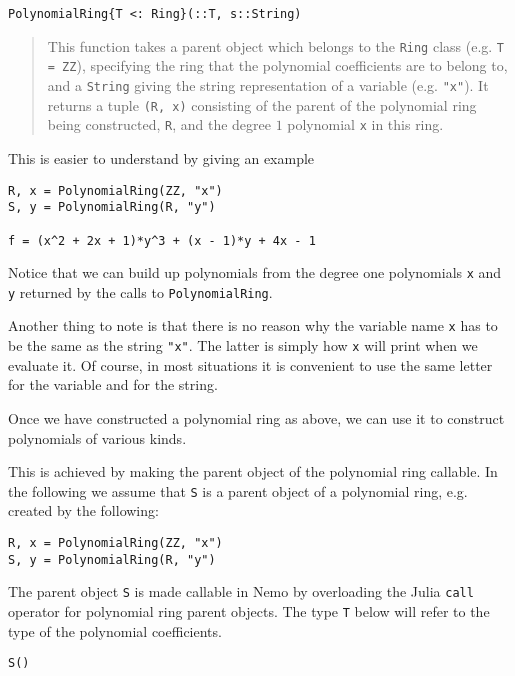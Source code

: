 \documentclass[a4paper,10pt]{article}
\newcommand{\code}{\lstinline}
\newcommand{\desc}[1]{\vspace{-3mm}\begin{quote}#1\end{quote}}
\begin{document}
\begin{lstlisting}
PolynomialRing{T <: Ring}(::T, s::String)
\end{lstlisting}

\desc{This function takes a parent object which belongs to the \code|Ring| class 
(e.g. \code|T = ZZ|), specifying the ring that the polynomial coefficients are to 
belong to, and a \code{String} giving the string representation of a variable (e.g. 
\code|"x"|). It returns a tuple \code|(R, x)| consisting of the parent of the polynomial
ring being constructed, \code|R|, and the degree $1$ polynomial \code|x| in this ring.}

This is easier to understand by giving an example

\begin{lstlisting}
R, x = PolynomialRing(ZZ, "x")
S, y = PolynomialRing(R, "y")

f = (x^2 + 2x + 1)*y^3 + (x - 1)*y + 4x - 1
\end{lstlisting}

Notice that we can build up polynomials from the degree one polynomials \code{x} and
\code{y} returned by the calls to \code{PolynomialRing}. 

Another thing to note is that there is no reason why the variable name \code{x} has
to be the same as the string \code{"x"}. The latter is simply how \code{x} will print
when we evaluate it. Of course, in most situations it is convenient to use the same 
letter for the variable and for the string.

Once we have constructed a polynomial ring as above, we can use it to construct
polynomials of various kinds.

This is achieved by making the parent object of the polynomial ring callable. In the
following we assume that \code{S} is a parent object of a polynomial ring, e.g.
created by the following:

\begin{lstlisting}
R, x = PolynomialRing(ZZ, "x")
S, y = PolynomialRing(R, "y")
\end{lstlisting}

The parent object \code{S} is made callable in Nemo by overloading the Julia
\code{call} operator for polynomial ring parent objects. The type \code{T}
below will refer to the type of the polynomial coefficients.

\begin{lstlisting}
S()
\end{lstlisting}
\end{document}
